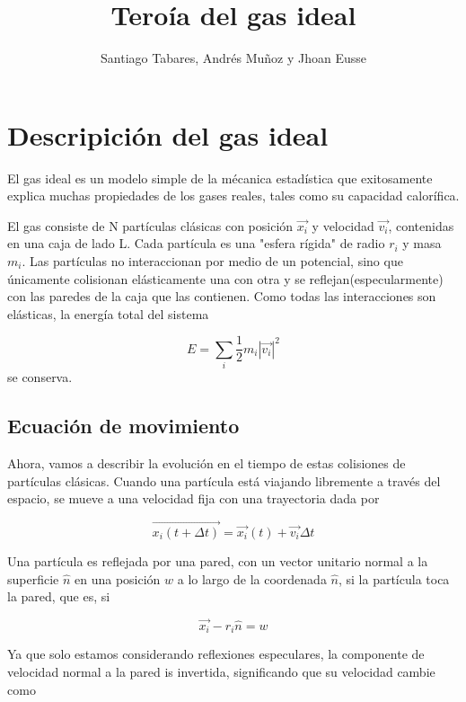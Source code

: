 \documentclass[11pt]{article}
\title{Teroía del gas ideal}
\author{Santiago Tabares, Andrés Muñoz y Jhoan Eusse}
\date{}
\begin{document}
\maketitle

\section{Descripición del gas ideal}

El gas ideal es un modelo simple de la mécanica estadística que exitosamente explica muchas propiedades de los gases reales, tales como su capacidad calorífica. 

El gas consiste de N partículas clásicas con posición $\vec{x_{i}}$ y velocidad $\vec{v_i}$, contenidas en una caja de lado L. Cada partícula es una "esfera rígida" de radio $r_{i}$ y masa $m_{i}$. Las partículas no interaccionan por medio de un potencial, sino que únicamente colisionan  elásticamente una con otra y se reflejan(especularmente) con las paredes de la caja que las contienen. Como todas las interacciones son elásticas, la energía total del sistema 

\begin{equation}
    E = \sum_{i} \dfrac{1}{2}m_{i}|\vec{v_{i}}|^{2}
    \end{equation}
se conserva.

\subsection{Ecuación de movimiento}

Ahora, vamos a describir la evolución en el tiempo de estas colisiones de partículas clásicas. Cuando una partícula está viajando libremente a través del espacio, se mueve a una velocidad fija con una trayectoria dada por 

\begin{equation}
    \vec{x_{i}(t + \Delta t)} = \vec{x_{i}}(t) + \vec{v_{i}}\Delta t 
\end{equation}

Una partícula es reflejada por una pared, con un vector unitario normal a la superficie $\hat{n}$ en una posición $w$ a lo largo de la coordenada $\hat{n}$, si la partícula toca la pared, que es, si 

\begin{equation}
    \vec{x_{i}} - r_{i}\hat{n} = w
\end{equation}

Ya que solo estamos considerando reflexiones especulares, la componente de velocidad normal a la pared is invertida, significando que su velocidad cambie como
\end{document}
